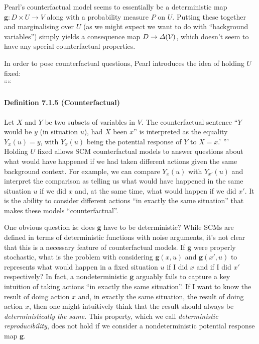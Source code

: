 Pearl's counterfactual model seems to essentially be a deterministic map $\mathbf{g}:D\times U\to V$ along with a probability measure $P$ on $U$. Putting these together and marginalising over $U$ (as we might expect we want to do with ``background variables'') simply yields a consequence map $D\to \Delta(\mathcal{V})$, which doesn't seem to have any special counterfactual properties.

In order to pose counterfactual questions, Pearl introduces the idea of holding $U$ fixed:
\\
````
\paragraph{Definition 7.1.5 (Counterfactual)}
Let $X$ and $Y$ be two subsets of variables in $V$. The counterfactual sentence ``$Y$ would be $y$ (in situation $u$), had $X$ been $x$'' is interpreted as the equality $Y_x(u) = y$, with $Y_x(u)$
being the potential response of $Y$ to $X = x$.'
'''
\\

Holding $U$ fixed allows SCM counterfactual models to answer questions about what would have happened if we had taken different actions given the same background context. For example, we can compare $Y_x(u)$ with $Y_{x'}(u)$ and interpret the comparison as telling us what would have happened in the same situation $u$ if we did $x$ and, at the same time, what would happen if we did $x'$. It is the ability to consider different actions ``in exactly the same situation'' that makes these models ``counterfactual''.

One obvious question is: does $\mathbf{g}$ have to be deterministic? While SCMs are defined in terms of deterministic functions with noise arguments, it's not clear that this is a necessary feature of counterfactual models. If $\mathbf{g}$ were properly stochastic, what is the problem with considering $\mathbf{g}(x,u)$ and $\mathbf{g}(x',u)$ to represents what would happen in a fixed situation $u$ if I did $x$ and if I did $x'$ respectively? In fact, a nondeterministic $\mathbf{g}$  arguably fails to capture a key intuition of taking actions ``in exactly the same situation''. If I want to know the result of doing action $x$ and, in exactly the same situation, the result of doing action $x$, then one might intuitively think that the result should always be \emph{deterministically the same}. This property, which we call \emph{deterministic reproducibility}, does not hold if we consider a nondeterministic potential response map $\mathbf{g}$.

